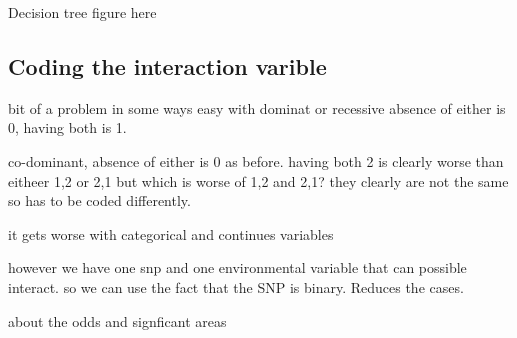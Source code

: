 \documentclass[10pt,a4paper]{report}
\begin{document}
Decision tree figure here

\subsection{Coding the interaction varible}
bit of a problem in some ways
easy with dominat or recessive
absence of either is 0, having both is 1.

co-dominant, absence of either is 0 as before. having both 2 is clearly worse than eitheer 1,2 or 2,1
but which is worse of 1,2 and 2,1? they clearly are not the same so has to be coded differently.

it gets worse with categorical and continues variables

however we have one snp and one environmental variable that can possible interact. so we can use the fact that the SNP is binary. Reduces the cases.

about the odds and signficant areas

\clearpage
\end{document}
